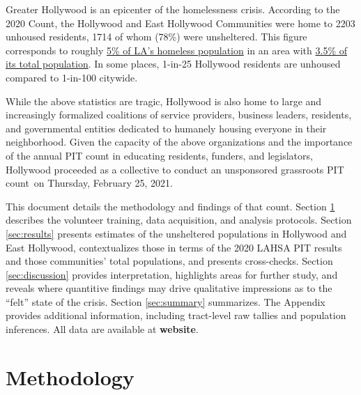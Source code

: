 \documentclass[11pt,twocolumn]{article}
\def\bfr{\bf\color{red}}
\def\Count{count}
\begin{document}
Greater Hollywood is an epicenter of the homelessness crisis. According to the 2020 Count, the 
Hollywood and East Hollywood Communities were home to 2203 unhoused residents, 1714 of whom 
(78\%) were unsheltered. This figure corresponds to roughly 
\href{https://www.lahsa.org/data?id=45-2020-homeless-count-by-community-city}
{5\% of LA's homeless population} in an area with \href{https://geomap.ffiec.gov/FFIECGeocMap/GeocodeMap1.aspx}{3.5\% of its total population}. In some places, 1-in-25 Hollywood residents are 
unhoused compared to 1-in-100 citywide.

While the above statistics are tragic, Hollywood is also home to large and increasingly formalized
coalitions of service providers, business leaders, residents, and governmental entities dedicated to 
humanely housing everyone in their neighborhood. Given the capacity of the above organizations and 
the importance of the annual PIT count in educating residents, funders, and legislators, Hollywood 
proceeded as a collective to conduct an unsponsored grassroots PIT \Count\ on Thursday, 
February 25, 2021.

This document details the methodology and findings of that \Count. 
Section \ref{sec:procedure} describes the volunteer training, data acquisition, 
and analysis protocols. Section \ref{sec:results} presents estimates of the unsheltered 
populations in Hollywood and East Hollywood, contextualizes those in terms of the 2020 
LAHSA PIT results and those communities' total populations, and presents cross-checks. 
Section \ref{sec:discussion} provides interpretation, highlights areas for further study, and 
reveals where quantitive findings may drive qualitative impressions as to the ``felt'' state of 
the crisis. Section \ref{sec:summary} summarizes. The Appendix provides additional information, 
including tract-level raw tallies and population inferences. All data are available at {\bfr website}.

\section{Methodology}
\label{sec:procedure}
%
%
\end{document}
